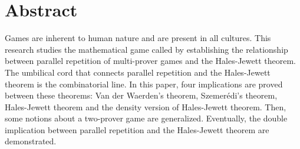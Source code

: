 
\chapter*{Abstract} 

Games are inherent to  human nature and are present in all cultures. This research studies the mathematical game called 
by establishing the relationship between parallel repetition of multi-prover games and the Hales-Jewett theorem. The umbilical cord that connects parallel repetition and the Hales-Jewett theorem is the combinatorial line.
In this paper,
four implications are proved between these theorems: Van der Waerden's theorem, Szemerédi's theorem, Hales-Jewett theorem and the density version of Hales-Jewett theorem. Then,  some notions about a two-prover game
are  generalized. Eventually, the double implication between parallel repetition and the Hales-Jewett theorem are
demonstrated.





